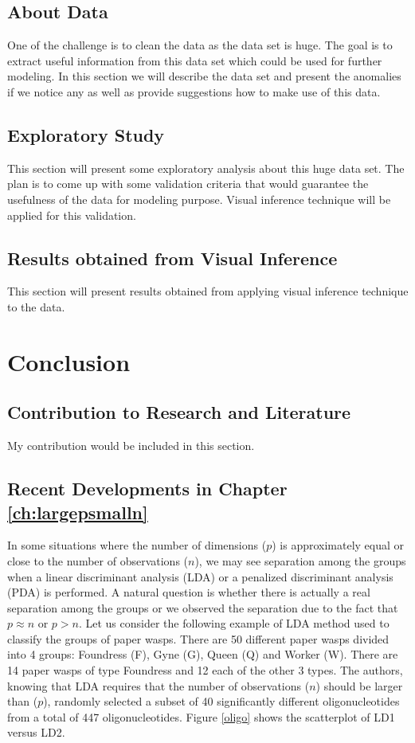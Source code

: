 \documentclass[12]{report}
\begin{document}
\section{About Data} One of the challenge is to clean the data as the data set is huge. The goal is to extract useful information from this data set which could be used for further modeling. In this section we will describe the data set and present the anomalies if we notice any as well as provide suggestions how to make use of this data.

\section{Exploratory Study} This section will present some exploratory analysis about this huge data set. The plan is to come up with some validation criteria that would guarantee the usefulness of the data for modeling purpose. Visual inference technique will be applied for this validation.

\section{Results obtained from Visual Inference} This section will present results obtained from applying visual inference technique to the data.%

\chapter{Conclusion}\label{ch:conclusion}

\section{Contribution to Research and Literature} My contribution would be included in this section.

\section{Recent Developments in Chapter \ref{ch:largepsmalln}}

In some situations where the number of dimensions ($p$) is approximately equal or close to the number of observations ($n$), we may see separation among the groups when a linear discriminant analysis (LDA) or a penalized discriminant analysis (PDA) is performed. A natural question is whether there is actually a real separation among the groups or we observed the separation due to the fact that $p \approx n$ or $p > n$. Let us consider the following example of LDA method used to classify the groups of paper wasps. There are 50 different paper wasps divided into 4 groups: Foundress (F), Gyne (G), Queen (Q) and Worker (W). There are 14 paper wasps of type Foundress and 12 each of the other 3 types. The authors, knowing that LDA requires that the number of observations ($n$) should be larger than ($p$), randomly selected a subset of 40 significantly different oligonucleotides from a total of 447 oligonucleotides. Figure \ref{oligo} shows the scatterplot of LD1 versus LD2.
\end{document}
